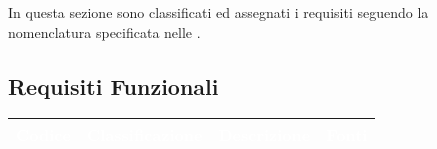 In questa sezione sono classificati ed assegnati i requisiti seguendo la nomenclatura specificata nelle \NdP.

\subsection{Requisiti Funzionali}

{
      \setlength{\freewidth}{\dimexpr\textwidth-10\tabcolsep}
      \renewcommand{\arraystretch}{1.5}
      \centering
      \setlength{\aboverulesep}{0pt}
      \setlength{\belowrulesep}{0pt}
      \begin{longtable}{C{.257\freewidth} C{.257\freewidth} C{.257\freewidth} C{.257\freewidth}}
         \toprule
      \textcolor{white}{\textbf{Codice}}&
      \textcolor{white}{\textbf{Classificazione}}&
      \textcolor{white}{\textbf{Descrizione}}&
      \textcolor{white}{\textbf{Fonti}}\\	
      \toprule
      \endhead
      

\end{longtable}}

